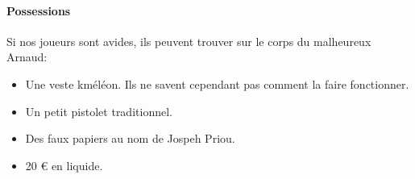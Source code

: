 \documentclass[10pt,a4paper,twocolumn]{article}
\begin{document}
\paragraph*{Possessions}
Si nos joueurs sont avides, ils peuvent trouver sur le corps du malheureux Arnaud:
\begin{itemize}
	\item Une veste kméléon. Ils ne savent cependant pas comment la faire fonctionner.
	\item Un petit pistolet traditionnel.
	\item Des faux papiers au nom de Jospeh Priou.
	\item 20 € en liquide.
\end{itemize}
\end{document}
